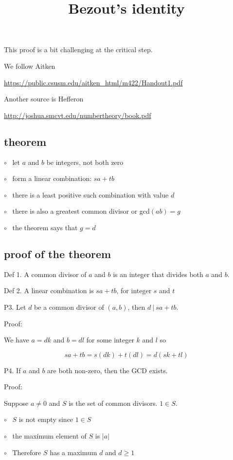 \documentclass[11pt, oneside]{article}
\title{Bezout's identity}
\date{}
\begin{document}
\maketitle
\Large

This proof is a bit challenging at the critical step.  

We follow Aitken 

\url{https://public.csusm.edu/aitken_html/m422/Handout1.pdf}

Another source is Hefferon 

\url{http://joshua.smcvt.edu/numbertheory/book.pdf} 

\subsection*{theorem}

$\circ$ \ let $a$ and $b$ be integers, not both zero

$\circ$ \ form a linear combination: $sa + tb$

$\circ$ \ there is a least positive such combination with value $d$

$\circ$ \ there is also a greatest common divisor or gcd$(ab) = g$

$\circ$ \ the theorem says that $g = d$

\subsection*{proof of the theorem}

Def 1.  A common divisor of $a$ and $b$ is an integer that divides both $a$ and $b$.

Def 2.  A linear combination is $sa + tb$, for integer $s$ and $t$

P3.  Let $d$ be a common divisor of $(a,b)$, then $d \ | \ sa + tb$.

Proof:

We have $a = dk$ and $b =dl$ for some integer $k$ and $l$ so

\[ sa + tb = s(dk) + t(dl) = d(sk + tl) \]

P4.  If $a$ and $b$ are both non-zero, then the GCD exists.

Proof:  

Suppose $a \ne 0$ and $S$ is the set of common divisors.  $1 \in S$.
    
$\circ$ \ $S$ is not empty since $1 \in S$

$\circ$ \ the maximum element of $S$ is $|a|$

$\circ$ \ Therefore $S$ has a maximum $d$ and $d \ge 1$
\end{document}
